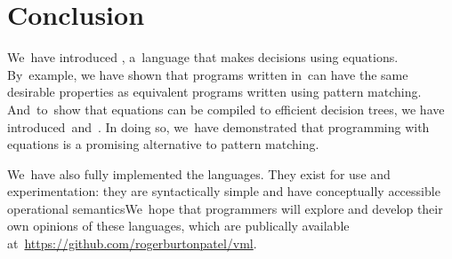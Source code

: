 \documentclass[article,screen,12pt, nonacm]{acmart}
\begin{document}

        

    \section{Conclusion}

    We~have introduced \VMinus, a~language that makes decisions using equations.
    By~example, we have shown that programs written in~\VMinus can have the same
    desirable properties as equivalent programs written using pattern matching.
    And~to~show that equations can be compiled to efficient decision trees, we
    have introduced~\D and~\DTran. In doing so, we~have demonstrated that
    programming with equations is a promising alternative to pattern matching.

    We~have also fully implemented the languages. They exist for use and
    experimentation: they are syntactically simple and have conceptually
    accessible operational semanticsWe~hope that programmers will explore and
    develop their own opinions of these languages, which are publically
    available at~\url{https://github.com/rogerburtonpatel/vml}. 

    
    
\end{document}
